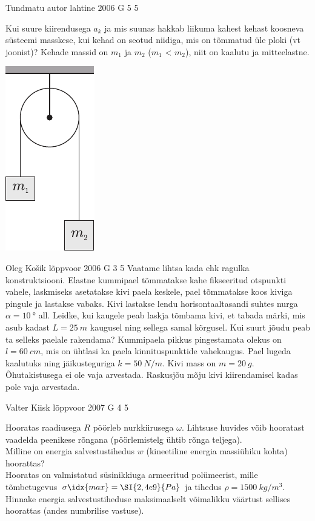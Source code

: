 \documentclass[11pt, twoside]{article}
\begin{document}
{%
{Tundmatu autor} %
{lahtine} %
{2006} %
{G 5} %
{5} %
{
\ifStatement
Kui suure kiirendusega $a_k$ ja mis suunas hakkab liikuma kahest kehast koosneva süsteemi masskese, kui kehad on seotud niidiga, mis on tõmmatud üle ploki (vt joonist)? Kehade massid on $m_1$ ja $m_2$ ($m_1$ < $m_2$), niit on kaalutu ja mitteelastne.
\begin{center}
	\includegraphics[width=0.25\linewidth]{2006-lahg-05-yl}
\end{center}
\fi
}

{Oleg Košik} %
{lõppvoor} %
{2006} %
{G 3} %
{5} %
{
\ifStatement
Vaatame lihtsa kada ehk ragulka konstruktsiooni. Elastne kummipael tõmmatakse kahe fikseeritud otspunkti vahele, laskmiseks asetatakse kivi paela keskele, pael tõmmatakse koos kiviga pingule ja lastakse vabaks. Kivi lastakse lendu horisontaaltasandi suhtes nurga $\alpha = \SI{10}{\degree}$ all. Leidke, kui kaugele peab laskja tõmbama kivi, et tabada märki, mis asub kadast $L = \SI{25}{m}$ kaugusel ning sellega samal kõrgusel. Kui suurt jõudu peab ta selleks paelale rakendama? Kummipaela pikkus pingestamata olekus on $l = \SI{60}{cm}$, mis on ühtlasi ka paela kinnituspunktide vahekaugus. Pael lugeda kaalutuks ning jäikusteguriga $k = \SI{50}{N/m}$. Kivi mass on $m = \SI{20}{g}$. Õhutakistusega ei ole vaja arvestada. Raskusjõu mõju kivi kiirendamisel kadas pole vaja arvestada.
\fi
}

{Valter Kiisk} %
{lõppvoor} %
{2007} %
{G 4} %
{5} %
{
\ifStatement
Hooratas raadiusega $R$ pöörleb nurkkiirusega $\omega$. Lihtsuse huvides võib hooratast vaadelda peenikese rõngana (pöörlemistelg ühtib rõnga teljega).\\
\osa Milline on energia salvestustihedus $w$ (kineetiline energia massiühiku kohta) hoorattas?\\
\osa Hooratas on valmistatud süsinikkiuga armeeritud polümeerist, mille tõmbetugevus $\sigma\idx{max} = \SI{2,4e9}{Pa}$ ja tihedus $\rho = \SI{1500}{kg/m^3}$. Hinnake energia salvestustiheduse maksimaalselt võimalikku väärtust sellises hoorattas (andes numbrilise vastuse).

}}
\end{document}
